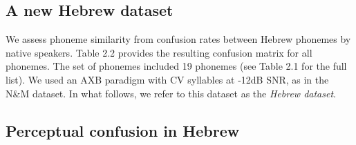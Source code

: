 \subsection{A new Hebrew dataset}
We assess phoneme similarity from confusion rates between Hebrew phonemes by native speakers. Table 2.2 provides the resulting confusion matrix for all phonemes. The set of phonemes included 19 phonemes (see Table 2.1 for the full list). We used an AXB paradigm with CV syllables at -12dB SNR, as in the N\&M dataset. In what follows, we refer to this dataset as the \textit{Hebrew dataset}.

\begin{landscape}
\section{Perceptual confusion in Hebrew}
\begin{table}[H]
\centering
 \begin{tabular}{|c||c|c|c|c|c|c|c|c|c|c|c|c|c|c|c|c|c|c|c||c|}
\hline


\end{tabular}
\end{table}
\end{landscape}
